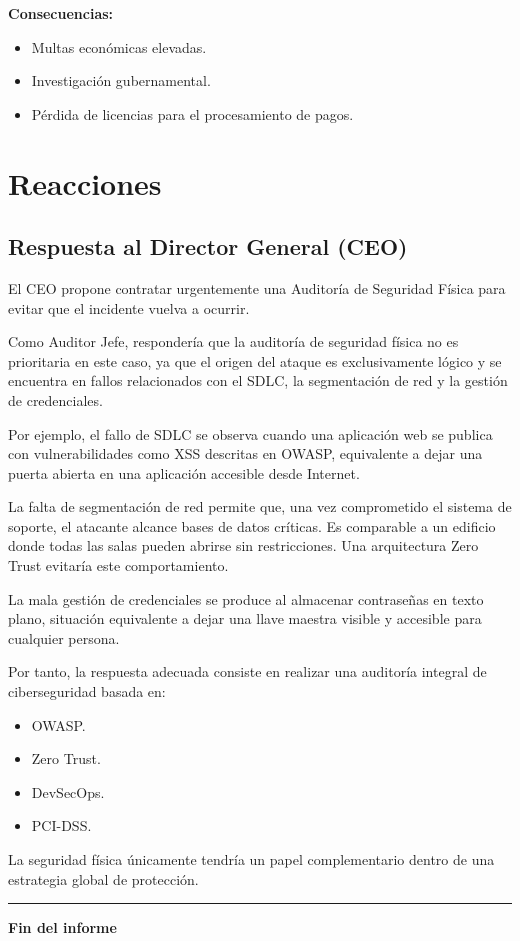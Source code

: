 \documentclass[11pt,a4paper]{article}
\begin{document}
\textbf{Consecuencias:}

\begin{itemize}
    \item Multas económicas elevadas.
    \item Investigación gubernamental.
    \item Pérdida de licencias para el procesamiento de pagos.
\end{itemize}


\section{Reacciones}

\subsection{Respuesta al Director General (CEO)}

El CEO propone contratar urgentemente una Auditoría de Seguridad Física para evitar que el incidente vuelva a ocurrir.

Como Auditor Jefe, respondería que la auditoría de seguridad física no es prioritaria en este caso, ya que el origen del ataque es exclusivamente lógico y se encuentra en fallos relacionados con el SDLC, la segmentación de red y la gestión de credenciales.

Por ejemplo, el fallo de SDLC se observa cuando una aplicación web se publica con vulnerabilidades como XSS descritas en OWASP, equivalente a dejar una puerta abierta en una aplicación accesible desde Internet.

La falta de segmentación de red permite que, una vez comprometido el sistema de soporte, el atacante alcance bases de datos críticas. Es comparable a un edificio donde todas las salas pueden abrirse sin restricciones. Una arquitectura Zero Trust evitaría este comportamiento.

La mala gestión de credenciales se produce al almacenar contraseñas en texto plano, situación equivalente a dejar una llave maestra visible y accesible para cualquier persona.

Por tanto, la respuesta adecuada consiste en realizar una auditoría integral de ciberseguridad basada en:

\begin{itemize}
    \item OWASP.
    \item Zero Trust.
    \item DevSecOps.
    \item PCI-DSS.
\end{itemize}

La seguridad física únicamente tendría un papel complementario dentro de una estrategia global de protección.

\vfill

\begin{center}
\rule{0.4\textwidth}{0.4pt}

\vspace{0.3cm}

\textbf{Fin del informe}
\end{center}
\end{document}
